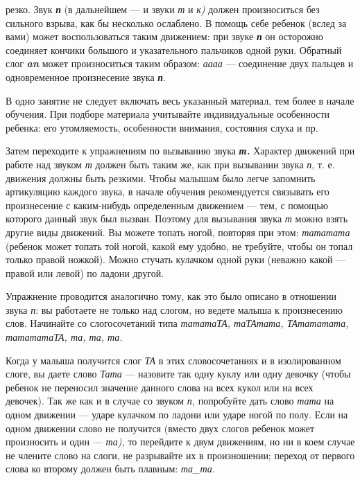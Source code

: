 \documentclass{book}
\renewcommand{\emph}[1]{\textit{#1}}
\begin{document}
резко. Звук \emph{\textbf{п}} (в дальнейшем --- и звуки \emph{т} и
\emph{к)} должен произноситься без сильного взрыва, как бы несколько
ослаблено. В помощь себе ребенок (вслед за вами) может воспользоваться
таким движением: при звуке \emph{\textbf{п}} он осторожно соединяет
кончики большого и указательного пальчиков одной руки. Обратный слог
\emph{\textbf{an}} может произноситься таким образом: \emph{аааа} ---
соединение двух пальцев и одновременное произнесение звука
\emph{\textbf{п}}.

В одно занятие не следует включать весь указанный материал, тем более в
начале обучения. При подборе материала учитывайте индивидуальные
особенности ребенка: его утомляемость, особенности внимания, состояния
слуха и пр.

Затем переходите к упражнениям по вызыванию звука \emph{\textbf{т.}}
Характер движений при работе над звуком \emph{т} должен быть таким же,
как при вызывании звука \emph{п}, т. е. движения должны быть резкими.
Чтобы малышам было легче запомнить артикуляцию каждого звука, в начале
обучения рекомендуется связывать его произнесение с каким-нибудь
определенным движением --- тем, с помощью которого данный звук был
вызван. Поэтому для вызывания звука \emph{т} можно взять другие виды
движений. Вы можете топать ногой, повторяя при этом: \emph{тататата}
(ребенок может топать той ногой, какой ему удобно, не требуйте, чтобы он
топал только правой ножкой). Можно стучать кулачком одной руки (неважно
какой --- правой или левой) по ладони другой.

Упражнение проводится аналогично тому, как это было описано в отношении
звука \emph{п}: вы работаете не только над слогом, но ведете малыша к
произнесению слов. Начинайте со слогосочетаний типа \emph{тататаТА,
таТАтата, ТАтататата, татататаТА, та, та, та.}

Когда у малыша получится слог \emph{ТА} в этих словосочетаниях и в
изолированном слоге, вы даете слово \emph{Тата} --- назовите так одну
куклу или одну девочку (чтобы ребенок не переносил значение данного
слова на всех кукол или на всех девочек). Так же как и в случае со
звуком \emph{п,} попробуйте дать слово \emph{тата} на одном движении ---
ударе кулачком по ладони или ударе ногой по полу. Если на одном движении
слово не получится (вместо двух слогов ребенок может произносить и один
--- \emph{та),} то перейдите к двум движениям, но ни в коем случае не
члените слово на слоги, не разрывайте их в произношении; переход от
первого слова ко второму должен быть плавным: \emph{та\_та.}
\end{document}

